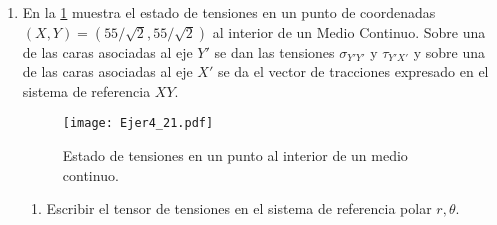 \documentclass[../notas medios.tex]{subfiles}
\begin{document}
\begin{enumerate}
\begin{enumerate}
	\end{enumerate}
%
\item \label{punto21} En la \cref{PtoPol} muestra el estado de tensiones en un punto de coordenadas $(X,Y) = (55/\sqrt{2},55/\sqrt{2})$  al interior de un Medio Continuo. Sobre una de las caras asociadas al eje $Y'$ se dan las tensiones $\sigma_{Y'Y'}$ y $\tau_{Y'X'}$ y sobre una de las caras asociadas al eje $X'$ se da el vector de tracciones expresado en el sistema de referencia $XY$.
%
\begin{figure}[H]
	\centering
	\texttt{[image: Ejer4\_21.pdf]} 
	\caption{Estado de tensiones en un punto al interior de un medio continuo.}
	\label{PtoPol}
\end{figure}
%
\begin{enumerate}
	\item Escribir el tensor de tensiones en el sistema de referencia polar $r,\theta$. \\
\end{enumerate}
%
%
% 	


\end{enumerate}
\end{document}
